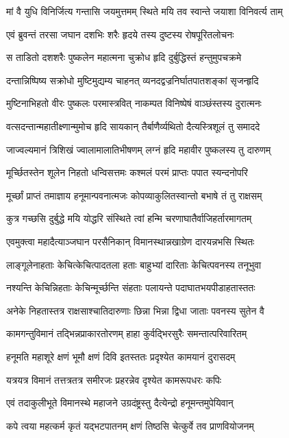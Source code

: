 \twolineshloka
{मां वै युधि विनिर्जित्य गन्तासि जयमुत्तमम्}
{स्थिते मयि तव स्वान्ते जयाशा विनिवर्त्य ताम्}%

\twolineshloka
{एवं ब्रुवन्तं तरसा जघान दशभिः शरैः}
{हृदये तस्य दुष्टस्य रोषपूरितलोचनः}%

\twolineshloka
{स ताडितो दशशरैः पुष्कलेन महात्मना}
{चुक्रोध हृदि दुर्बुद्धिस्तं हन्तुमुपचक्रमे}%

\twolineshloka
{दन्तान्निष्पिष्य सक्रोधो मुष्टिमुद्यम्य चाहनत्}
{व्यनदद्वज्रनिर्घातपातशङ्कां सृजन्हृदि}%

\twolineshloka
{मुष्टिनाभिहतो वीरः पुष्कलः परमास्त्रवित्}
{नाकम्पत विनिष्पेषं वाञ्छंस्तस्य दुरात्मनः}%

\twolineshloka
{वत्सदन्तान्महातीक्ष्णान्मुमोच हृदि सायकान्}
{तैर्बाणैर्व्यथितो दैत्यस्त्रिशूलं तु समाददे}%

\twolineshloka
{जाज्वल्यमानं त्रिशिखं ज्वालामालातिभीषणम्}
{लग्नं हृदि महावीर पुष्कलस्य तु दारुणम्}%

\twolineshloka
{मूर्च्छितस्तेन शूलेन निहतो धन्विसत्तमः}
{कश्मलं परमं प्राप्तः पपात स्यन्दनोपरि}%

\twolineshloka
{मूर्च्छां प्राप्तं तमाज्ञाय हनूमान्पवनात्मजः}
{कोपव्याकुलितस्वान्तो बभाषे तं तु राक्षसम्}%

\twolineshloka
{कुत्र गच्छसि दुर्बुद्धे मयि योद्धरि संस्थिते}
{त्वां हन्मि चरणाघातैर्वाजिहर्तारमागतम्}%

\twolineshloka
{एवमुक्त्वा महादैत्याञ्जघान परसैनिकान्}
{विमानस्थान्नखाग्रेण दारयन्नभसि स्थितः}%

\twolineshloka
{लाङ्गूलेनाहताः केचित्केचित्पादतला हताः}
{बाहुभ्यां दारिताः केचित्पवनस्य तनूभुवा}%

\twolineshloka
{नश्यन्ति केचिन्निहताः केचिन्मूर्च्छन्ति संहताः}
{पलायन्ते पदाघातभयपीडाहतास्ततः}%

\twolineshloka
{अनेके निहतास्तत्र राक्षसाश्चातिदारुणाः}
{छिन्ना भिन्ना द्विधा जाताः पवनस्य सुतेन वै}%

\twolineshloka
{कामगन्तुविमानं तद्भिन्नप्राकारतोरणम्}
{हाहा कुर्वद्भिरसुरैः समन्तात्परिवारितम्}%

\twolineshloka
{हनूमति महाशूरे क्षणं भूमौ क्षणं दिवि}
{इतस्ततः प्रदृश्येत कामयानं दुरासदम्}%

\twolineshloka
{यत्रयत्र विमानं तत्तत्रतत्र समीरजः}
{प्रहरन्नेव दृश्येत कामरूपधरः कपिः}%

\twolineshloka
{एवं तदाकुलीभूते विमानस्थे महाजने}
{उग्रदंष्ट्रस्तु दैत्येन्द्रो हनूमन्तमुपेयिवान्}%

\twolineshloka
{कपे त्वया महत्कर्म कृतं यद्भटपातनम्}
{क्षणं तिष्ठसि चेत्कुर्वे तव प्राणवियोजनम्}%

